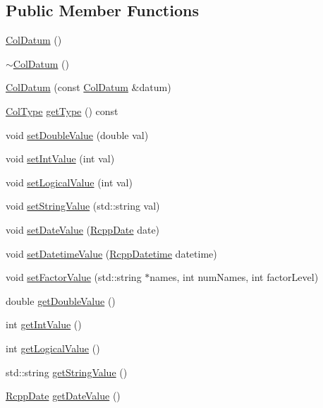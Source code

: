 \subsection*{Public Member Functions}
\begin{DoxyCompactItemize}
\item 
\hyperlink{classColDatum_ab0aa09b7e8d9acd2b0435b256c6b4da7}{ColDatum} ()
\item 
\hyperlink{classColDatum_accc1e3ec9da32643bd4953f983165b64}{$\sim$ColDatum} ()
\item 
\hyperlink{classColDatum_a0507c6e2b4c76ee5364af001855fbe4e}{ColDatum} (const \hyperlink{classColDatum}{ColDatum} \&datum)
\item 
\hyperlink{Rcpp_8h_a3145f0ed02782c5b592881e0e8e53655}{ColType} \hyperlink{classColDatum_aae862d41617b3ae39f88b5b729ccccc3}{getType} () const 
\item 
void \hyperlink{classColDatum_aedf3ac3ea399222524f02f3468ec97a0}{setDoubleValue} (double val)
\item 
void \hyperlink{classColDatum_a80d401e1efb6e714113990c78e72eb84}{setIntValue} (int val)
\item 
void \hyperlink{classColDatum_a19ebd9c0e3e2544c8679999ab91c9e20}{setLogicalValue} (int val)
\item 
void \hyperlink{classColDatum_aa87060ae6c415167d501c41684d8a586}{setStringValue} (std::string val)
\item 
void \hyperlink{classColDatum_a988defa165f1d5ab7cde96d2c86c7c69}{setDateValue} (\hyperlink{classRcppDate}{RcppDate} date)
\item 
void \hyperlink{classColDatum_a5803eb7a89dc467b88d7d412462c6fb5}{setDatetimeValue} (\hyperlink{classRcppDatetime}{RcppDatetime} datetime)
\item 
void \hyperlink{classColDatum_abd6f582044692c2215d9cd4add379ea1}{setFactorValue} (std::string $\ast$names, int numNames, int factorLevel)
\item 
double \hyperlink{classColDatum_a6a19044be8ade2b14b372b179210a9bd}{getDoubleValue} ()
\item 
int \hyperlink{classColDatum_af498266608526c9db7f865bc66cc5e40}{getIntValue} ()
\item 
int \hyperlink{classColDatum_adf81b2aed6f8e19b6f36310288991f38}{getLogicalValue} ()
\item 
std::string \hyperlink{classColDatum_ad0d76d861441151f31cf42acff4b8c0f}{getStringValue} ()
\item 
\hyperlink{classRcppDate}{RcppDate} \hyperlink{classColDatum_a70480f53f9cee46bcdaed7331e38c943}{getDateValue} ()

\end{DoxyCompactItemize}
